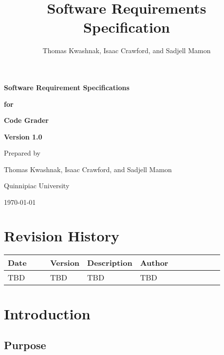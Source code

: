 \documentclass{article}
\title{Software Requirements Specification}
\author{Thomas Kwashnak, Isaac Crawford, and Sadjell Mamon}
\begin{document}

\begin{titlepage}
  \vspace*{1cm}

  \Huge
  \textbf{Software Requirement Specifications}

  \vspace{0.5cm}

  \textbf{for}

  \vspace{0.5cm}

  \textbf{Code Grader}

  \vspace{2cm}

  \LARGE
  \textbf{Version 1.0}

  \vspace{3cm}

  Prepared by

  Thomas Kwashnak, Isaac Crawford, and Sadjell Mamon

  \vspace{0.75cm}
  Quinnipiac University

  \vspace{7cm}

  \today
\end{titlepage}

\section*{Revision History}

\begin{tabular}{| p{0.2\linewidth} | p{0.075\linewidth} | p{0.2\linewidth} | p{0.4\linewidth} |}
  \hline
  Date & Version & Description & Author\\
  \hline
  \hline
  TBD & TBD & TBD & TBD \\
  \hline

\end{tabular}

\newpage

\tableofcontents

\newpage

\section{Introduction}

\subsection{Purpose}
\end{document}
